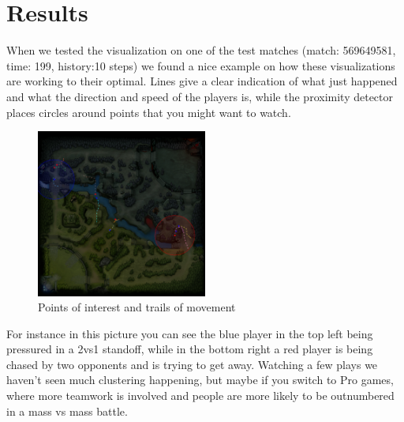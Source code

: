 \documentclass[a4paper]{article}
\theoremstyle{plain} %
\theoremstyle{definition} %
\begin{document}
\section*{Results}
When we tested the visualization on one of the test matches (match: 569649581, time: 199, history:10 steps) we found a nice example on how these visualizations are working to their optimal. Lines give a clear indication of what just happened and what the direction and speed of the players is, while the proximity detector places circles around points that you might want to watch.
\begin{figure}[h!]
 	\centering
    	\includegraphics[width=0.5\textwidth]{proximity}
\caption*{Points of interest and trails of movement}
\end{figure}
For instance in this picture you can see the blue player in the top left being pressured in a 2vs1 standoff, while in the bottom right a red player is being chased by two opponents and is trying to get away.
Watching a few plays we haven't seen much clustering happening, but maybe if you switch to Pro games, where more teamwork is involved and people are more likely to be outnumbered in a mass vs mass battle.\\
\end{document}
